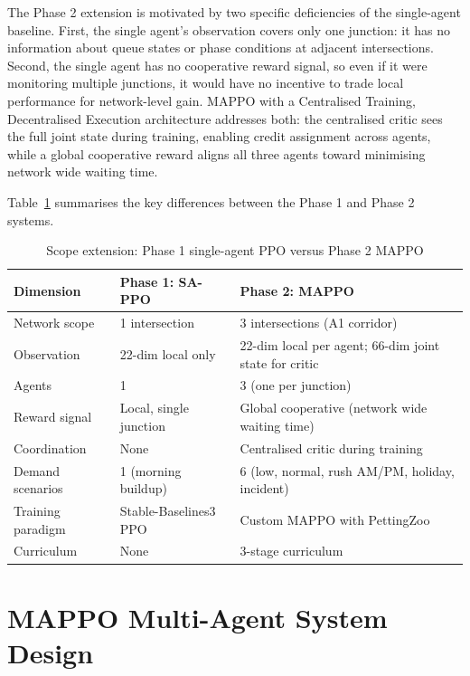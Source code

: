 ﻿\documentclass[11pt, a4paper]{report}
\begin{document}
The Phase 2 extension is motivated by two specific deficiencies of the single-agent baseline. First, the single agent's observation covers only one junction: it has no information about queue states or phase conditions at adjacent intersections. Second, the single agent has no cooperative reward signal, so even if it were monitoring multiple junctions, it would have no incentive to trade local performance for network-level gain. MAPPO with a Centralised Training, Decentralised Execution architecture addresses both: the centralised critic sees the full joint state during training, enabling credit assignment across agents, while a global cooperative reward aligns all three agents toward minimising network wide waiting time.

Table~\ref{tab:scope_extension} summarises the key differences between the Phase 1 and Phase 2 systems.

\begin{table}[H]
\centering
\caption{Scope extension: Phase 1 single-agent PPO versus Phase 2 MAPPO}
\label{tab:scope_extension}
\begin{tabular}{p{3.5cm}p{4.5cm}p{4.5cm}}
\toprule
\textbf{Dimension} & \textbf{Phase 1: SA-PPO} & \textbf{Phase 2: MAPPO} \\
\midrule
Network scope & 1 intersection & 3 intersections (A1 corridor) \\
Observation & 22-dim local only & 22-dim local per agent; 66-dim joint state for critic \\
Agents & 1 & 3 (one per junction) \\
Reward signal & Local, single junction & Global cooperative (network wide waiting time) \\
Coordination & None & Centralised critic during training \\
Demand scenarios & 1 (morning buildup) & 6 (low, normal, rush AM/PM, holiday, incident) \\
Training paradigm & Stable-Baselines3 PPO & Custom MAPPO with PettingZoo \\
Curriculum & None & 3-stage curriculum \\
\bottomrule
\end{tabular}
\end{table}

\chapter{MAPPO Multi-Agent System Design}
\label{chap:mappo_system}
\end{document}
